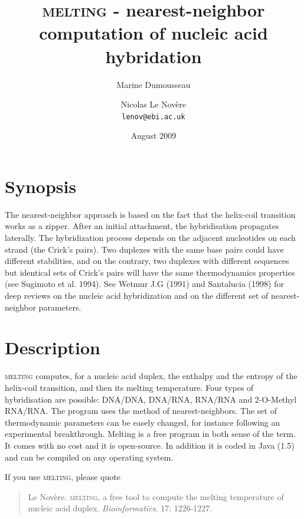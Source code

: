 \documentclass{article}
\begin{document}
\title{\textsc{melting} - nearest-neighbor computation of nucleic acid hybridation}
\author{Marine Dumousseau \and Nicolas Le Nov\`ere \\
  \texttt{lenov@ebi.ac.uk}}
\date{August 2009}
\maketitle

\newpage

\tableofcontents

\newpage

\nocite{*}

\section{Synopsis}
The nearest-neighbor approach is based on the fact that the helix-coil
transition works as a zipper. After an initial attachment, the hybridisation
propagates laterally.
The hybridization process depends on the adjacent nucleotides on each strand (the Crick's pairs).  
Two duplexes with the same base pairs could have different stabilities, and on the contrary, two 
duplexes with different sequences but identical sets of Crick's pairs will have the same
thermodynamics properties (see Sugimoto et al. 1994).
See Wetmur J.G (1991) and Santalucia (1998) for deep reviews on the nucleic acid hybridization
and on the different set of nearest-neighbor parameters.
 
\section{Description }

\textsc{melting} computes, for a nucleic acid duplex, the enthalpy and the
entropy of the helix-coil transition, and then its melting temperature. Four
types of hybridisation are possible: DNA/DNA, DNA/RNA, RNA/RNA and 2-O-Methyl RNA/RNA. The program
uses the method of nearest-neighbors. The set of thermodynamic parameters can be
easely changed, for instance following an experimental breakthrough. Melting is
a free program in both sense of the term. It comes with no cost and it is
open-source. In addition it is coded in Java (1.5) and can be compiled on any
operating system.


If you use \textsc{melting}, please quote

\begin{quote}
  Le Nov\`ere. \textsc{melting}, a free tool to compute the
    melting temperature of nucleic acid duplex. \emph{Bioinformatics}, 17: 1226-1227. 
\end{quote}
\end{document}
